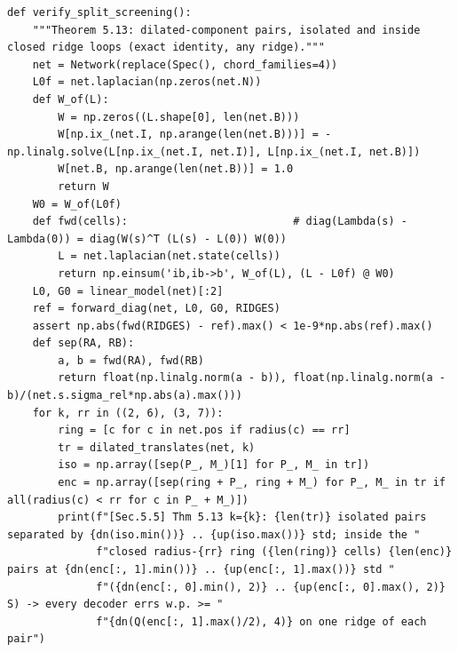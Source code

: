 \documentclass[11pt,a4paper]{article}
\theoremstyle{definition}
\theoremstyle{remark}
\begin{document}
\begin{lstlisting}
def verify_split_screening():
    """Theorem 5.13: dilated-component pairs, isolated and inside closed ridge loops (exact identity, any ridge)."""
    net = Network(replace(Spec(), chord_families=4))
    L0f = net.laplacian(np.zeros(net.N))
    def W_of(L):
        W = np.zeros((L.shape[0], len(net.B)))
        W[np.ix_(net.I, np.arange(len(net.B)))] = -np.linalg.solve(L[np.ix_(net.I, net.I)], L[np.ix_(net.I, net.B)])
        W[net.B, np.arange(len(net.B))] = 1.0
        return W
    W0 = W_of(L0f)
    def fwd(cells):                          # diag(Lambda(s) - Lambda(0)) = diag(W(s)^T (L(s) - L(0)) W(0))
        L = net.laplacian(net.state(cells))
        return np.einsum('ib,ib->b', W_of(L), (L - L0f) @ W0)
    L0, G0 = linear_model(net)[:2]
    ref = forward_diag(net, L0, G0, RIDGES)
    assert np.abs(fwd(RIDGES) - ref).max() < 1e-9*np.abs(ref).max()
    def sep(RA, RB):
        a, b = fwd(RA), fwd(RB)
        return float(np.linalg.norm(a - b)), float(np.linalg.norm(a - b)/(net.s.sigma_rel*np.abs(a).max()))
    for k, rr in ((2, 6), (3, 7)):
        ring = [c for c in net.pos if radius(c) == rr]
        tr = dilated_translates(net, k)
        iso = np.array([sep(P_, M_)[1] for P_, M_ in tr])
        enc = np.array([sep(ring + P_, ring + M_) for P_, M_ in tr if all(radius(c) < rr for c in P_ + M_)])
        print(f"[Sec.5.5] Thm 5.13 k={k}: {len(tr)} isolated pairs separated by {dn(iso.min())} .. {up(iso.max())} std; inside the "
              f"closed radius-{rr} ring ({len(ring)} cells) {len(enc)} pairs at {dn(enc[:, 1].min())} .. {up(enc[:, 1].max())} std "
              f"({dn(enc[:, 0].min(), 2)} .. {up(enc[:, 0].max(), 2)} S) -> every decoder errs w.p. >= "
              f"{dn(Q(enc[:, 1].max()/2), 4)} on one ridge of each pair")



\end{lstlisting}
\end{document}

